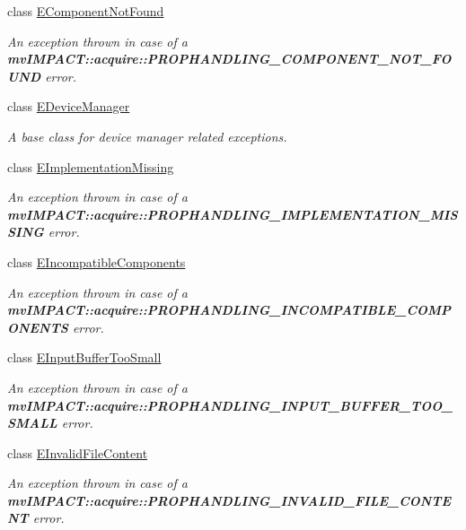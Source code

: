 \begin{DoxyCompactItemize}
class \hyperlink{classmv_i_m_p_a_c_t_1_1acquire_1_1_e_component_not_found}{E\+Component\+Not\+Found}
\begin{DoxyCompactList}\small\item\em An exception thrown in case of a {\bfseries mv\+I\+M\+P\+A\+C\+T\+::acquire\+::\+P\+R\+O\+P\+H\+A\+N\+D\+L\+I\+N\+G\+\_\+\+C\+O\+M\+P\+O\+N\+E\+N\+T\+\_\+\+N\+O\+T\+\_\+\+F\+O\+U\+N\+D} error. \end{DoxyCompactList}\item 
class \hyperlink{classmv_i_m_p_a_c_t_1_1acquire_1_1_e_device_manager}{E\+Device\+Manager}
\begin{DoxyCompactList}\small\item\em A base class for device manager related exceptions. \end{DoxyCompactList}\item 
class \hyperlink{classmv_i_m_p_a_c_t_1_1acquire_1_1_e_implementation_missing}{E\+Implementation\+Missing}
\begin{DoxyCompactList}\small\item\em An exception thrown in case of a {\bfseries mv\+I\+M\+P\+A\+C\+T\+::acquire\+::\+P\+R\+O\+P\+H\+A\+N\+D\+L\+I\+N\+G\+\_\+\+I\+M\+P\+L\+E\+M\+E\+N\+T\+A\+T\+I\+O\+N\+\_\+\+M\+I\+S\+S\+I\+N\+G} error. \end{DoxyCompactList}\item 
class \hyperlink{classmv_i_m_p_a_c_t_1_1acquire_1_1_e_incompatible_components}{E\+Incompatible\+Components}
\begin{DoxyCompactList}\small\item\em An exception thrown in case of a {\bfseries mv\+I\+M\+P\+A\+C\+T\+::acquire\+::\+P\+R\+O\+P\+H\+A\+N\+D\+L\+I\+N\+G\+\_\+\+I\+N\+C\+O\+M\+P\+A\+T\+I\+B\+L\+E\+\_\+\+C\+O\+M\+P\+O\+N\+E\+N\+T\+S} error. \end{DoxyCompactList}\item 
class \hyperlink{classmv_i_m_p_a_c_t_1_1acquire_1_1_e_input_buffer_too_small}{E\+Input\+Buffer\+Too\+Small}
\begin{DoxyCompactList}\small\item\em An exception thrown in case of a {\bfseries mv\+I\+M\+P\+A\+C\+T\+::acquire\+::\+P\+R\+O\+P\+H\+A\+N\+D\+L\+I\+N\+G\+\_\+\+I\+N\+P\+U\+T\+\_\+\+B\+U\+F\+F\+E\+R\+\_\+\+T\+O\+O\+\_\+\+S\+M\+A\+L\+L} error. \end{DoxyCompactList}\item 
class \hyperlink{classmv_i_m_p_a_c_t_1_1acquire_1_1_e_invalid_file_content}{E\+Invalid\+File\+Content}
\begin{DoxyCompactList}\small\item\em An exception thrown in case of a {\bfseries mv\+I\+M\+P\+A\+C\+T\+::acquire\+::\+P\+R\+O\+P\+H\+A\+N\+D\+L\+I\+N\+G\+\_\+\+I\+N\+V\+A\+L\+I\+D\+\_\+\+F\+I\+L\+E\+\_\+\+C\+O\+N\+T\+E\+N\+T} error. \end{DoxyCompactList}\item 

\end{DoxyCompactItemize}
